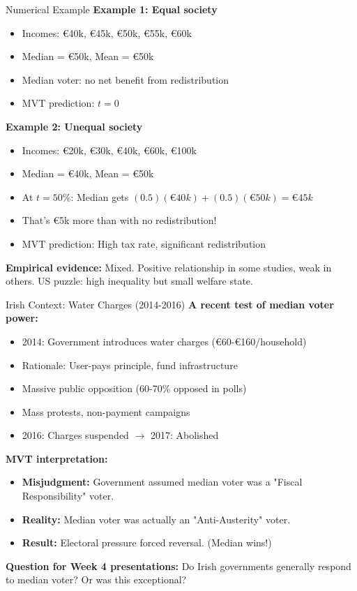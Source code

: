 \documentclass[10pt]{beamer}
\begin{document}
\begin{frame}{Numerical Example}
\textbf{Example 1: Equal society}
\begin{itemize}
\item Incomes: €40k, €45k, €50k, €55k, €60k
\item Median = €50k, Mean = €50k
\item Median voter: no net benefit from redistribution
\item \alert{MVT prediction:} $t = 0$
\end{itemize}



\textbf{Example 2: Unequal society}
\begin{itemize}
\item Incomes: €20k, €30k, €40k, €60k, €100k
\item Median = €40k, Mean = €50k
\item At $t = 50\%$: Median gets $(0.5)(€40k) + (0.5)(€50k) = €45k$
\item That's €5k more than with no redistribution!
\item \alert{MVT prediction:} High tax rate, significant redistribution
\end{itemize}



\textbf{Empirical evidence:} Mixed. Positive relationship in some studies, weak in others. US puzzle: high inequality but small welfare state.
\end{frame}

\begin{frame}{Irish Context: Water Charges (2014-2016)}
\textbf{A recent test of median voter power:}

\begin{itemize}
\item 2014: Government introduces water charges (€60-€160/household)
\item Rationale: User-pays principle, fund infrastructure
\item \alert{Massive public opposition} (60-70\% opposed in polls)
\item Mass protests, non-payment campaigns
\item 2016: Charges suspended $\rightarrow$ 2017: Abolished
\end{itemize}

\textbf{MVT interpretation:}
\begin{itemize}
\item \textbf{Misjudgment:} Government assumed median voter was a "Fiscal Responsibility" voter.
\item \textbf{Reality:} Median voter was actually an "Anti-Austerity" voter.
\item \textbf{Result:} Electoral pressure forced reversal. (Median wins!)
\end{itemize}

\textbf{Question for Week 4 presentations:} Do Irish governments generally respond to median voter? Or was this exceptional?
\end{frame}
\end{document}
